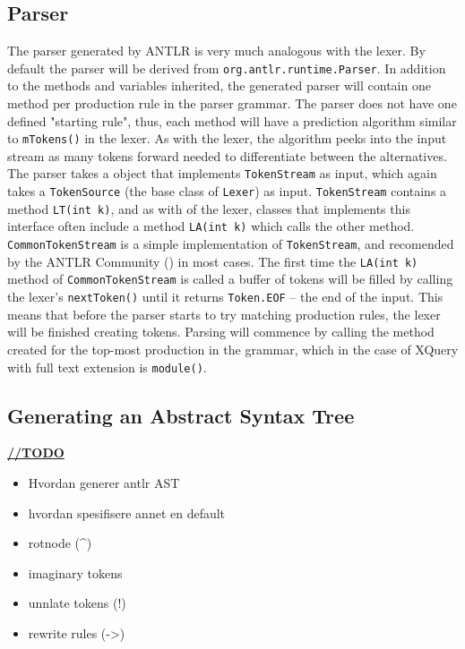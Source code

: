 \subsection{Parser}
The parser generated by ANTLR is very much analogous with the lexer. By default the parser will be derived from \verb!org.antlr.runtime.Parser!. In addition to the methods and variables inherited, the generated parser will contain one method per production rule in the parser grammar. The parser does not have one defined "starting rule", thus, each method will have a prediction algorithm similar to \verb!mTokens()! in the lexer. As with the lexer, the algorithm peeks into the input stream as many tokens forward needed to differentiate between the alternatives. The parser takes a object that implements \verb!TokenStream! as input, which again takes a \verb!TokenSource! (the base class of \verb!Lexer!) as input. \verb!TokenStream! contains a method \verb!LT(int k)!, and as with of the lexer, classes that implements this interface often include a method \verb!LA(int k)! which calls the other method. \verb!CommonTokenStream! is a simple implementation of \verb!TokenStream!, and recomended by the ANTLR Community (\cite{antlrorg}) in most cases. The first time the \verb!LA(int k)! method of \verb!CommonTokenStream! is called a buffer of tokens will be filled by calling the lexer's \verb!nextToken()! until it returns \verb!Token.EOF! -- the end of the input. This means that before the parser starts to try matching production rules, the lexer will be finished creating tokens. Parsing will commence by calling the method created for the top-most production in the grammar, which in the case of XQuery with full text extension is \verb!module()!.

\subsection{Generating an Abstract Syntax Tree}
\underline{\textbf{\LARGE //TODO}}
\\
\begin{itemize}
\item Hvordan generer antlr AST 
\item hvordan spesifisere annet en default 
\item rotnode (\^{})
\item imaginary tokens
\item unnlate tokens (!)
\item rewrite rules (->)
\end{itemize}

